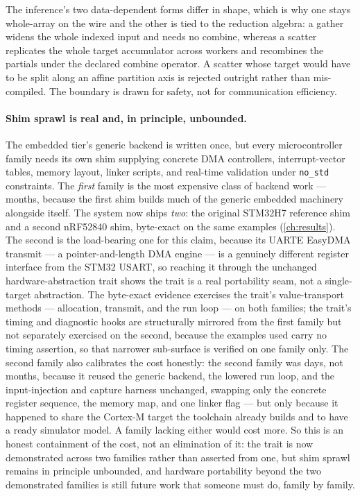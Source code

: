 The inference's two data-dependent forms differ in shape, which is why one stays
whole-array on the wire and the other is tied to the reduction algebra: a gather widens
the whole indexed input and needs no combine, whereas a scatter replicates the whole
target accumulator across workers and recombines the partials under the declared
combine operator. A scatter whose target would have to be split along an affine
partition axis is rejected outright rather than mis-compiled. The boundary is drawn for
safety, not for communication efficiency.

\paragraph{Shim sprawl is real and, in principle, unbounded.} The embedded tier's
generic backend is written once, but every microcontroller family needs its own
shim supplying concrete DMA controllers, interrupt-vector tables, memory layout,
linker scripts, and real-time validation under \texttt{no\_std} constraints. The
\emph{first} family is the most expensive class of backend work --- months, because
the first shim builds much of the generic embedded machinery alongside itself. The
system now ships \emph{two}: the original STM32H7 reference shim and a second
nRF52840 shim, byte-exact on the same examples (\cref{ch:results}). The second is
the load-bearing one for this claim, because its UARTE EasyDMA transmit --- a
pointer-and-length DMA engine --- is a genuinely different register interface from
the STM32 USART, so reaching it through the unchanged hardware-abstraction trait
shows the trait is a real portability seam, not a single-target abstraction. The
byte-exact evidence exercises the trait's value-transport methods --- allocation,
transmit, and the run loop --- on both families; the trait's timing and diagnostic
hooks are structurally mirrored from the first family but not separately exercised on
the second, because the examples used carry no timing assertion, so that narrower
sub-surface is verified on one family only. The second family also
calibrates the cost honestly: the second family was days, not months, because it
reused the generic backend, the lowered run loop, and the input-injection and
capture harness unchanged, swapping only the concrete register sequence, the memory
map, and one linker flag --- but only because it happened to share the Cortex-M
target the toolchain already builds and to have a ready simulator model. A family
lacking either would cost more. So this is an honest containment of the cost, not an
elimination of it: the trait is now demonstrated across two families rather than
asserted from one, but shim sprawl remains in principle unbounded, and hardware
portability beyond the two demonstrated families is still future work that someone
must do, family by family.

